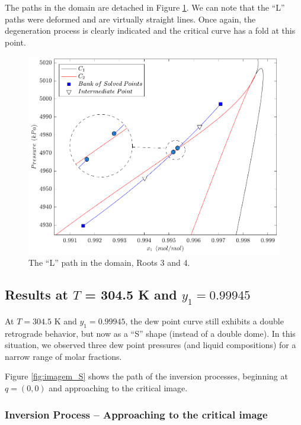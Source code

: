 \documentclass[journal=iecred,manuscript=article]{achemso}
\theoremstyle{definition}
\theoremstyle{remark}
\begin{document}
The paths in the domain are detached in Figure \ref{fig:L_path_domain}. We can note that the ``L'' paths were deformed and are virtually straight lines. Once again, the degeneration process is clearly indicated and the critical curve has a fold at this point.

\begin{figure}
	\begin{center}
		\includegraphics[scale=0.50]{caminhos_L_degeneracao_dominio_new.pdf}
		\caption{The ``L'' path in the domain, Roots 3 and 4.}\label{fig:L_path_domain}
	\end{center}
\end{figure}

\subsection{Results at $T$ = 304.5 K and $y_1 = 0.99945$}

At $T = 304.5$ K and $y_1 = 0.99945$, the dew point curve still exhibits a double retrograde behavior, but now as a ``S'' shape (instead of a double dome). In this situation, we observed three dew point pressures (and liquid compositions) for a narrow range of molar fractions.

Figure \ref{fig:imagem_S} shows the path of the inversion processes, beginning at $q = (0,0)$ and approaching to the critical image.

\subsubsection{Inversion Process -- Approaching to the critical image}
\end{document}
